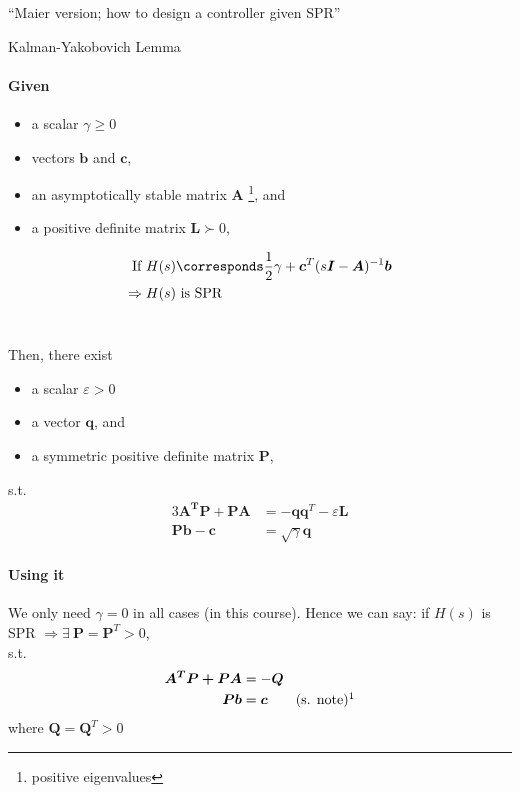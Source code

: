 ``Maier version; how to design a controller given SPR''\\

\begin{lemma}{Kalman-Yakobovich Lemma}
    \paragraph{Given}
    \begin{itemize}
    \item a scalar $\gamma \geq 0$
    \item vectors $\bm{b}$ and $\bm{c}$,
    \item an asymptotically stable matrix $\bm{A}$%
        \footnote{positive eigenvalues}, and
    \item a positive definite matrix $\bm{L} \succ 0$,
    \end{itemize}
    \begin{alignat*}{3}
    \txt{If } H(s) &\corresponds \frac{1}{2} \gamma + \bm{c}^T (s\bm{I}-\bm{A})^{-1} \bm{b}\\
        \Rightarrow H(s) &\txt{ is SPR}
    \end{alignat*}~

    Then, there exist
    \begin{itemize}
    \item a scalar $\varepsilon >0$
    \item a vector $\bm{q}$, and
    \item a symmetric positive definite matrix $\bm{P}$,
    \end{itemize}
    s.t.
    \begin{alignat}{3}
    \bm{A^TP + PA}   &= -\bm{qq}^T - \varepsilon \bm{L}\\
    \bm{Pb} - \bm{c}      &= \sqrt{\gamma} \bm{q}
    \end{alignat}
\end{lemma}

\paragraph{Using it}
We only need $\gamma=0$ in all cases (in this course).
Hence we can say: if $H(s)$ is SPR $\Rightarrow \exists ~ \bm{P}=\bm{P}^T>0$,\\
s.t.
\begin{alignat*}{3}
\bm{A^TP + PA}   &= -\bm{Q}\\
\bm{Pb} &= \bm{c} \qquad \txt{(s. note)}\footnotemark  \\
\end{alignat*}%
%
where $\bm{Q}=\bm{Q}^T>0$

